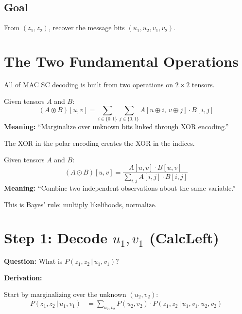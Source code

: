 \documentclass[11pt,a4paper]{article}
\newcommand{\conv}{\circledast}
\newcommand{\nprod}{\odot}
\begin{document}
\subsection{Goal}
From $(z_1, z_2)$, recover the message bits $(u_1, u_2, v_1, v_2)$.

\section{The Two Fundamental Operations}

All of MAC SC decoding is built from two operations on $2\times 2$ tensors.

\begin{tcolorbox}[colback=blue!5,colframe=convblue,title=Operation 1: Circular Convolution $(\conv)$]
Given tensors $A$ and $B$:
\[
\boxed{(A \conv B)[u,v] = \sum_{i \in \{0,1\}} \sum_{j \in \{0,1\}} A[u \oplus i,\, v \oplus j] \cdot B[i,j]}
\]
\textbf{Meaning:} ``Marginalize over unknown bits linked through XOR encoding.''

The XOR in the polar encoding creates the XOR in the indices.
\end{tcolorbox}

\begin{tcolorbox}[colback=green!5,colframe=prodgreen,title=Operation 2: Normalized Product $(\nprod)$]
Given tensors $A$ and $B$:
\[
\boxed{(A \nprod B)[u,v] = \frac{A[u,v] \cdot B[u,v]}{\displaystyle\sum_{i,j} A[i,j] \cdot B[i,j]}}
\]
\textbf{Meaning:} ``Combine two independent observations about the same variable.''

This is Bayes' rule: multiply likelihoods, normalize.
\end{tcolorbox}

\section{Step 1: Decode $u_1, v_1$ (CalcLeft)}

\textbf{Question:} What is $P(z_1, z_2 \,|\, u_1, v_1)$?

\textbf{Derivation:}

Start by marginalizing over the unknown $(u_2, v_2)$:
\begin{align}
P(z_1, z_2 \,|\, u_1, v_1)
&= \sum_{u_2, v_2} P(u_2, v_2) \cdot P(z_1, z_2 \,|\, u_1, v_1, u_2, v_2) \label{eq:marg}
\end{align}
\end{document}
